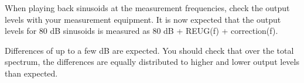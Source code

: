 \documentclass[11pt,a4paper,twoside]{article}
\newcommand{\+}{\discretionary{\mbox{\scriptsize$\hookleftarrow$}}{}{}}
\begin{document}
When playing back sinusoids at the measurement frequencies, check the output levels with your
measurement equipment. It is now expected that the output levels for 80 dB sinusoids is measured as 80 dB + REUG(f) + correction(f).

Differences of up to a few dB are expected. You should check that over
the total spectrum, the differences are equally distributed to higher
and lower output levels than expected.



\printindex
\end{document}
